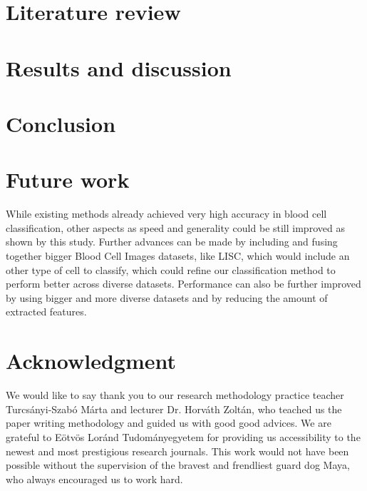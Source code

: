 \documentclass[conference]{IEEEtran}
\begin{document}


\section{Literature review}


\section{Results and discussion}
\section{Conclusion}
\section{Future work}

While existing methods already achieved very high accuracy in blood cell classification, other aspects as speed and generality could be still improved as shown by this study. 
Further advances can be made by including and fusing together bigger Blood Cell Images datasets, like LISC, which would include an other type of cell to classify, which could refine our classification method to perform better across diverse datasets.
Performance can also be further improved by using bigger and more diverse datasets and by reducing the
amount of extracted features.

\section*{Acknowledgment}

We would like to say thank you to our research methodology practice teacher Turcsányi-Szabó Márta and lecturer Dr. Horváth Zoltán, who teached us the paper writing methodology and guided us with good good advices.
We are grateful to Eötvös Loránd Tudományegyetem for providing us accessibility to the newest and most prestigious research journals.
This work would not have been possible without the supervision of the bravest and frendliest guard dog Maya, who always encouraged us to work hard.
\end{document}
